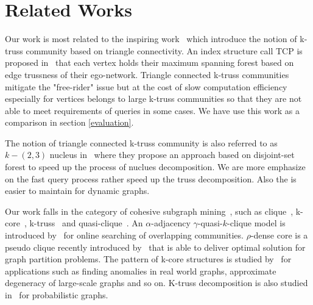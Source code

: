 \section{Related Works}
\label{relatedwork} 

Our work is most related to the inspiring work~\cite{huang2014querying} which introduce the notion of k-truss community based on triangle connectivity. An index structure call TCP is proposed in~\cite{huang2014querying} that each vertex holds their maximum spanning forest based on edge trussness of their ego-network. Triangle connected k-truss communities mitigate the "free-rider" issue but at the cost of slow computation efficiency especially for vertices belongs to large k-truss communities so that they are not able to meet requirements of queries in some cases. We have use this work as a comparison in section \autoref{evaluation}.

The notion of triangle connected k-truss community is also referred to as $k-(2,3)$ nucleus in~\cite{sariyuce2016fast} where they propose an approach based on disjoint-set forest to speed up the process of nuclues decomposition. We are more emphasize on the fast query process rather speed up the truss decomposition. Also the \treeindex{} is easier to maintain for dynamic graphs.

Our work falls in the category of cohesive subgraph mining~\cite{koujaku2016dense, sozio2010community, cui2014local, li2015influential, cui2013online, mcauley2012learning}, such as clique~\cite{bron1973algorithm, rossi2014fast}, k-core~\cite{cheng2011efficient, shin2016corescope}, k-truss~\cite{huang2014querying, wang2012truss, cohen2008trusses, huang2015approximate, huang2016truss} and quasi-clique~\cite{tsourakakis2013denser}. An $\alpha$-adjacency $\gamma$-quasi-$k$-clique model is introduced by~\cite{cui2014local} for online searching of overlapping communities. $\rho$-dense core is a pseudo clique recently introduced by~\cite{koujaku2016dense} that is able to deliver optimal solution for graph partition problems. The pattern of k-core structures is studied by~\cite{shin2016corescope} for applications such as finding anomalies in real world graphs, approximate degeneracy of large-scale graphs and so on. K-truss decomposition is also studied in~\cite{huang2016truss} for probabilistic graphs.

